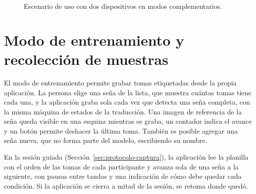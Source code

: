 \begin{figure}[h]
    \centering
    \caption{Escenario de uso con dos dispositivos en modos complementarios.}
    \label{fig:dos-dispositivos}
\end{figure}

\section{Modo de entrenamiento y recolección de muestras}

El modo de entrenamiento permite grabar tomas etiquetadas desde la propia aplicación. La persona elige una seña de la lista, que muestra cuántas tomas tiene cada una, y la aplicación graba sola cada vez que detecta una seña completa, con la misma máquina de estados de la traducción. Una imagen de referencia de la seña queda visible en una esquina mientras se graba, un contador indica el avance y un botón permite deshacer la última toma. También es posible agregar una seña nueva, que no forma parte del modelo, escribiendo su nombre.

En la sesión guiada (Sección~\ref{sec:protocolo-captura}), la aplicación lee la planilla con el orden de las tomas de cada participante y avanza sola de una seña a la siguiente, con pausas entre tandas y una indicación de cómo debe quedar cada condición. Si la aplicación se cierra a mitad de la sesión, se retoma donde quedó.

